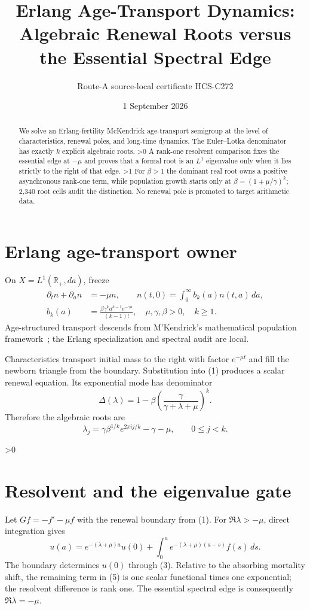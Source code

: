 \documentclass[10pt]{article}
\title{Erlang Age-Transport Dynamics:\\Algebraic Renewal Roots versus the Essential Spectral Edge}
\author{Route-A source-local certificate HCS-C272}
\date{1 September 2026}
\providecommand{\CRevisionRound}{2}
\begin{document}
\maketitle
\begin{abstract}
We solve an Erlang-fertility McKendrick age-transport semigroup at the level of characteristics, renewal poles, and long-time dynamics.  The Euler--Lotka denominator has exactly $k$ explicit algebraic roots.
\ifnum\CRevisionRound>0 A rank-one resolvent comparison fixes the essential edge at $-\mu$ and proves that a formal root is an $L^1$ eigenvalue only when it lies strictly to the right of that edge.\fi\space
\ifnum\CRevisionRound>1 For $\beta>1$ the dominant real root owns a positive asynchronous rank-one term, while population growth starts only at $\beta=(1+\mu/\gamma)^k$; 2,340 root cells audit the distinction.\fi\space
No renewal pole is promoted to target arithmetic data.
\end{abstract}

\section{Erlang age-transport owner}
On $X=L^1(\mathbb R_+,da)$, freeze
\begin{align}
 \partial_t n+\partial_a n&=-\mu n,\qquad
 n(t,0)=\int_0^\infty b_k(a)n(t,a)\,da,                 \tag{1}\\
 b_k(a)&=\frac{\beta\gamma^k a^{k-1}e^{-\gamma a}}{(k-1)!},
 \quad \mu,\gamma,\beta>0,\quad k\ge1.                 \tag{2}
\end{align}
Age-structured transport descends from M'Kendrick's mathematical population
framework~\cite{McK}; the Erlang specialization and spectral audit are local.

Characteristics transport initial mass to the right with factor $e^{-\mu t}$
and fill the newborn triangle from the boundary.  Substitution into (1)
produces a scalar renewal equation.  Its exponential mode has denominator
\begin{equation}
 \Delta(\lambda)=1-\beta
 \left(\frac{\gamma}{\gamma+\lambda+\mu}\right)^k.       \tag{3}
\end{equation}
Therefore the algebraic roots are
\begin{equation}
 \lambda_j=\gamma\beta^{1/k}e^{2\pi i j/k}-\gamma-\mu,
 \qquad 0\le j<k.                                       \tag{4}
\end{equation}

\ifnum\CRevisionRound>0
\section{Resolvent and the eigenvalue gate}
Let $Gf=-f'-\mu f$ with the renewal boundary from (1).  For
$\Re\lambda>-\mu$, direct integration gives
\[
 u(a)=e^{-(\lambda+\mu)a}u(0)+
 \int_0^a e^{-(\lambda+\mu)(a-s)}f(s)\,ds.              \tag{5}
\]
The boundary determines $u(0)$ through (3).  Relative to the absorbing
mortality shift, the remaining term in (5) is one scalar functional times one
exponential; the resolvent difference is rank one.  The essential spectral
edge is consequently $\Re\lambda=-\mu$.
\end{document}
